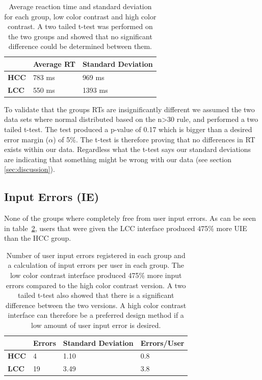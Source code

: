 \documentclass[runningheads,a4paper]{llncs}
\begin{document}
\begin{table}[]
	\centering
	\setlength{\tabcolsep}{1em}
	\setlength\extrarowheight{1em}
	\begin{tabular}{l|l|l}
		\textbf{} & \textbf{Average RT} & \textbf{Standard Deviation} \\ \hline
		\textbf{HCC} & 783 ms & 969 ms \\ \hline
		\textbf{LCC} & 550 ms & 1393 ms
	\end{tabular}
	\caption{Average reaction time and standard deviation for each group, low color contrast and high color contrast. A two tailed t-test was performed on the two groups and showed that no significant difference could be determined between them.
	\label{tab:groupRT}}
\end{table}

To validate that the groups RTs are insignificantly different we assumed the two data sets where normal distributed based on the n>30 rule, and performed a two tailed t-test. The test produced a p-value of 0.17 which is bigger than a desired error margin ($\alpha$) of 5\%. The t-test is therefore proving that no differences in RT exists within our data. Regardless what the t-test says our standard deviations are indicating that something might be wrong with our data (see section \ref{sec:discussion}).

\subsection{Input Errors (IE)}
None of the groups where completely free from user input errors. As can be seen in table~\ref{tab:userIE}, users that were given the LCC interface produced 475\% more UIE than the HCC group.

\begin{table}[]
	\centering
	\setlength{\tabcolsep}{1em}
	\setlength\extrarowheight{1em}
	\begin{tabular}{l|l|l|l}
		\textbf{} & \textbf{Errors} & \textbf{Standard Deviation} & \textbf{Errors/User} \\ \hline
		\textbf{HCC} & 4 & 1.10 & 0.8 \\ \hline
		\textbf{LCC} & 19 & 3.49 & 3.8
	\end{tabular}
	\caption{Number of user input errors registered in each group and a calculation of input errors per user in each group. The low color contrast interface produced 475\% more input errors compared to the high color contrast version. A two tailed t-test also showed that there is a significant difference between the two versions. A high color contrast interface can therefore be a preferred design method if a low amount of user input error is desired.
	\label{tab:userIE}}
\end{table}
\end{document}
